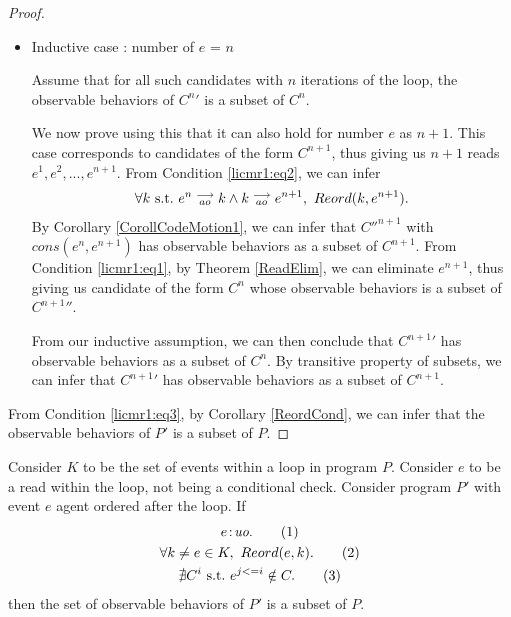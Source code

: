 \begin{proof}
\begin{itemize}
        \item Inductive case : number of $e$ = $n$

        Assume that for all such candidates with $n$ iterations of the loop, the observable behaviors of $C^{n}'$ is a subset of $C^n$.

        We now prove using this that it can also hold for number $e$ as $n + 1$. 
        This case corresponds to candidates of the form $C^{n+1}$, thus giving us $n+1$ reads $e^1, e^2,...,e^{n+1}$.
        From Condition \ref{licmr1:eq2}, we can infer 
        \begin{align*}
            \forall k \ \text{s.t.} \ e^n\stackrel{\longrightarrow}{_{ao}}k \wedge k\stackrel{\longrightarrow}{_{ao}}e^{n+1}, \ Reord(k,e^{n+1}).
        \end{align*}
        By Corollary \ref{CorollCodeMotion1}, we can infer that $C''^{n+1}$ with $cons(e^n, e^{n+1})$ has observable behaviors as a subset of $C^{n+1}$. 
        From Condition \ref{licmr1:eq1}, by Theorem \ref{ReadElim}, we can eliminate $e^{n+1}$, thus giving us candidate of the form $C^n$ whose observable behaviors is a subset of $C^{n+1}''$.

        From our inductive assumption, we can then conclude that $C^{n+1}'$ has observable behaviors as a subset of $C^n$. 
        By transitive property of subsets, we can infer that $C^{n+1}'$ has observable behaviors as a subset of $C^{n+1}$.

    \end{itemize}

    From Condition \ref{licmr1:eq3}, by Corollary \ref{ReordCond}, we can infer that the observable behaviors of $P'$ is a subset of $P$.
    
\end{proof}


\begin{corollary}
    \label{LoopInvCodeMotRead2}
    Consider $K$ to be the set of events within a loop in program $P$. 
    Consider $e$ to be a read within the loop, not being a conditional check. 
    Consider program $P'$ with event $e$ agent ordered after the loop. 
    If
    \begin{gather}
        e\!:\!\textit{uo}. \tag{1} \label{licmr2:eq1}\\
        \forall k \neq e \in K, \ Reord(e, k). \tag{2} \label{licmr2:eq2}\\ 
        \nexists C^i \ \text{s.t.} \ e^{j<=i} \notin C. \tag{3} \label{licmr2:eq3}                    
    \end{gather}
    then the set of observable behaviors of $P'$ is a subset of $P$.
\end{corollary}

